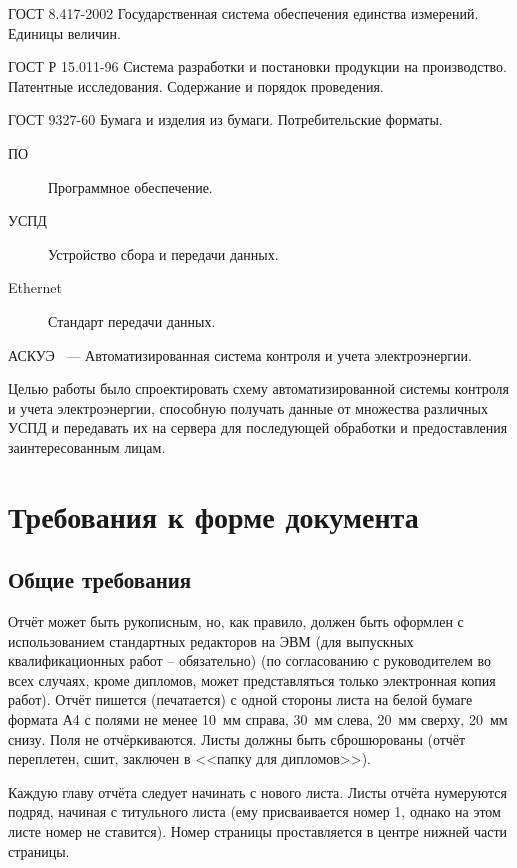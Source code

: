\documentclass[utf8,12pt, coursreport]{G7-32}
\begin{document}
ГОСТ 8.417-2002 Государственная система обеспечения единства измерений. Единицы величин.

ГОСТ Р 15.011-96 Система разработки и постановки продукции на производство. Патентные исследования. Содержание и порядок проведения.

ГОСТ 9327-60 Бумага и изделия из бумаги. Потребительские форматы.


\Abbreviations

\begin{description}
\item[ПО] Программное обеспечение.
\item[УСПД] Устройство сбора и передачи данных.
\item[Ethernet] Стандарт передачи данных.
\end{description}


\Introduction

АСКУЭ ~--- Автоматизированная система контроля и учета электроэнергии.

Целью работы было спроектировать схему автоматизированной системы контроля и учета электроэнергии, способную получать данные от множества различных УСПД и передавать их на сервера для последующей обработки и предоставления заинтересованным лицам.

\mainmatter %

\chapter{Требования к форме документа}

\section{Общие требования}

Отчёт может быть рукописным, но, как правило, должен быть оформлен с использованием стандартных редакторов на ЭВМ (для выпускных квалификационных работ -- обязательно) (по согласованию с руководителем во всех случаях, кроме дипломов, может представляться только электронная копия работ). Отчёт пишется (печатается) с одной стороны листа на белой бумаге формата А4 с полями не менее 10~мм справа, 30~мм слева, 20~мм сверху, 20~мм снизу. Поля не отчёркиваются. Листы должны быть сброшюрованы (отчёт переплетен, сшит, заключен в <<папку для дипломов>>).

Каждую главу отчёта следует начинать с нового листа. Листы отчёта нумеруются подряд, начиная с титульного листа (ему присваивается номер 1, однако на этом листе номер не ставится). Номер страницы проставляется в центре нижней части страницы.
\end{document}
